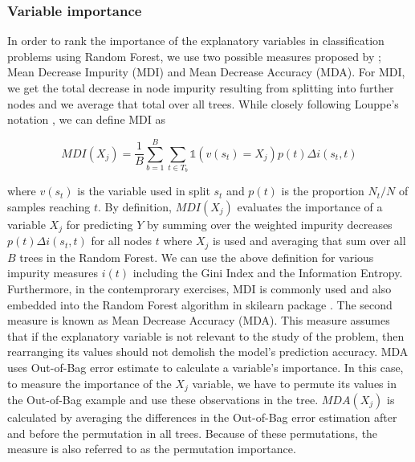 \subsubsection{Variable importance}
In order to rank the importance of the explanatory variables in classification problems using Random Forest, 
we use two possible measures proposed by \cite{breiman2001random}; 
Mean Decrease Impurity (MDI) and Mean Decrease Accuracy (MDA).
For MDI, we get the total decrease in node impurity 
resulting from splitting into further nodes and we average that total over all trees. 
While closely following Louppe's notation \cite{louppe2013understanding}, 
we can define MDI as

\begin{equation}\label{eq:MDI}
	{MDI}( X_{j} ) = \frac{1}{B} \sum_{b=1}^{B} \sum_{t \in T_{b}}\mathds{1}(v(s_{t})=  X_{j}) p(t)\Delta i(s_{t}, t)
\end{equation}

where $v(s_{t})$ is the variable used in split $s_{t}$ and $ p(t) $ is the proportion $N_{t}/N$ of samples reaching $t$.
By definition, $MDI( X_{j} )$ evaluates the importance of a variable $X_{j}$ for predicting $Y$ by 
summing over the weighted impurity decreases $p(t) \Delta i(s_{t}, t)$ for all nodes $t$ where $ X_{j}$ is used 
and averaging that sum over all $B$ trees in the Random Forest. 
We can use the above definition for various impurity measures $i(t)$ including the Gini Index and the Information Entropy. 
Furthermore, in the contemprorary exercises, MDI is commonly used and also embedded into the Random Forest algorithm 
in skilearn package \cite{scikit2011learn}.
The second measure is known as Mean Decrease Accuracy (MDA).
This measure assumes that if the explanatory variable is not relevant to the study of the problem,
then rearranging its values should not demolish the model's prediction accuracy.
MDA uses Out-of-Bag error estimate to calculate a variable's importance.
In this case, to measure the importance of the $X_{j}$ variable, we have to permute its values in the Out-of-Bag example and 
use these observations in the tree. $ MDA( X_{j} )$ is calculated by averaging the differences in the
Out-of-Bag error estimation after and before the permutation in all trees. Because of these permutations, 
the measure is also referred to as the permutation importance.

